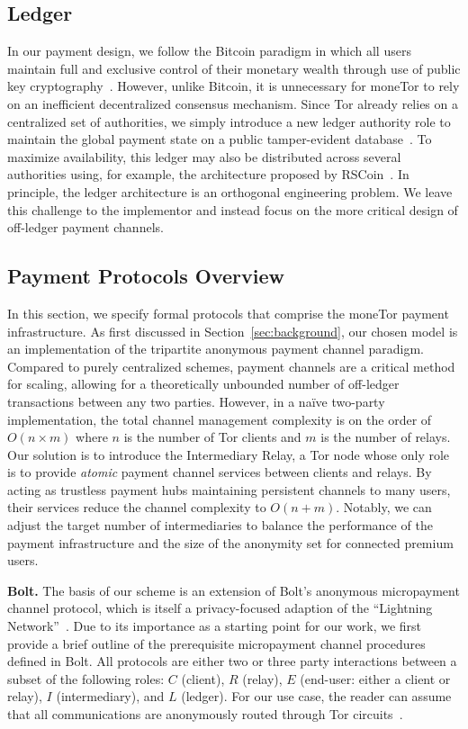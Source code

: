 \subsection{Ledger}

In our payment design, we follow the Bitcoin paradigm in which all users maintain full and exclusive control of their monetary wealth through use of public key cryptography~\cite{nakamoto2008bitcoin}.
However, unlike Bitcoin, it is unnecessary for moneTor to rely on an inefficient decentralized consensus mechanism.
Since Tor already relies on a centralized set of authorities, we simply introduce a new ledger authority role to maintain the global payment state on a public tamper-evident database~\cite{crosby2009efficient}.
To maximize availability, this ledger may also be distributed across several authorities using, for example, the architecture proposed by RSCoin~\cite{danezis2015centrally}.
In principle, the ledger architecture is an orthogonal engineering problem.
We leave this challenge to the implementor and instead focus on the more critical design of off-ledger payment channels.

\subsection{Payment Protocols Overview}
\label{sec:payment_overview}

In this section, we specify formal protocols that comprise the moneTor payment infrastructure.
As first discussed in Section~\ref{sec:background}, our chosen model is an implementation of the tripartite anonymous payment channel paradigm.
Compared to purely centralized schemes, payment channels are a critical method for scaling, allowing for a theoretically unbounded number of off-ledger transactions between any two parties.
However, in a na\"{i}ve two-party implementation, the total channel management complexity is on the order of $O(n \times m)$ where $n$ is the number of Tor clients and $m$ is the number of relays.
Our solution is to introduce the Intermediary Relay, a Tor node whose only role is to provide \emph{atomic} payment channel services between clients and relays.
By acting as trustless payment hubs maintaining persistent channels to many users, their services reduce the channel complexity to $O(n+m)$.
Notably, we can adjust the target number of intermediaries to balance the performance of the payment infrastructure and the size of the anonymity set for connected premium users.

\medskip \noindent\textbf{Bolt.} The basis of our scheme is an extension of Bolt's anonymous micropayment channel protocol, which is itself a privacy-focused adaption of the ``Lightning Network''~\cite{poon2016bitcoin}.
Due to its importance as a starting point for our work, we first provide a brief outline of the prerequisite micropayment channel procedures defined in Bolt.
All protocols are either two or three party interactions between a subset of the following roles: $C$ (client), $R$ (relay), $E$ (end-user: either a client or relay), $I$ (intermediary), and $L$ (ledger).
For our use case, the reader can assume that all communications are anonymously routed through Tor circuits~\cite{green2017bolt}.

